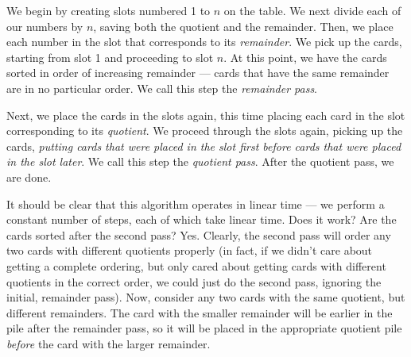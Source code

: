 \documentclass[12pt]{amsart}
\begin{document}
\begin{enumerate}
\begin{enumerate}
We begin by creating slots numbered 1 to $n$ on the table.  We next
divide each of our numbers by $n$, saving both the quotient and the
remainder.  Then, we place each number in the slot that corresponds to
its {\em remainder}.  We pick up the cards, starting from slot 1 and
proceeding to slot $n$.  At this point, we have the cards sorted in
order of increasing remainder --- cards that have the same remainder
are in no particular order.  We call this step the {\em remainder
pass}.

Next, we place the cards in the slots again, this time placing each
card in the slot corresponding to its {\em quotient}.  We proceed
through the slots again, picking up the cards, {\em putting cards that
were placed in the slot first before cards that were placed in the
slot later}.  We call this step the {\em quotient pass}.  After the
quotient pass, we are done.

It should be clear that this algorithm operates in linear time --- we
perform a constant number of steps, each of which take linear time.
Does it work?  Are the cards sorted after the second pass?  Yes.
Clearly, the second pass will order any two cards with different
quotients properly (in fact, if we didn't care about getting a
complete ordering, but only cared about getting cards with different
quotients in the correct order, we could just do the second pass,
ignoring the initial, remainder pass).  Now, consider any two cards
with the same quotient, but different remainders.  The card with the
smaller remainder will be earlier in the pile after the remainder
pass, so it will be placed in the appropriate quotient pile {\em
before} the card with the larger remainder.

\end{enumerate}

\end{enumerate}
\end{document}

